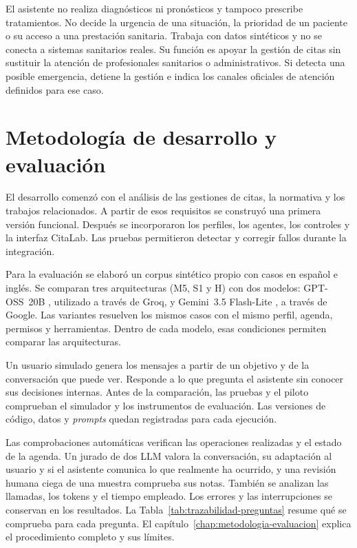 El asistente no realiza diagnósticos ni pronósticos y tampoco prescribe
tratamientos. No decide la urgencia de una situación, la prioridad de un
paciente o su acceso a una prestación sanitaria. Trabaja con datos sintéticos y
no se conecta a sistemas sanitarios reales. Su función es apoyar la gestión de
citas sin sustituir la atención de profesionales sanitarios o administrativos.
Si detecta una posible emergencia, detiene la gestión e indica los canales
oficiales de atención definidos para ese caso.

\section{Metodología de desarrollo y evaluación}

El desarrollo comenzó con el análisis de las gestiones de citas, la normativa
y los trabajos relacionados. A partir de esos requisitos se construyó una
primera versión funcional. Después se incorporaron los perfiles, los agentes,
los controles y la interfaz CitaLab. Las pruebas permitieron detectar y
corregir fallos durante la integración.

Para la evaluación se elaboró un corpus sintético propio con casos en español
e inglés. Se comparan tres arquitecturas (M5, S1 y H) con dos modelos:
GPT-OSS~20B \citep{openai2025gptoss}, utilizado a través de Groq, y
Gemini~3.5 Flash-Lite \citep{gemini35FlashLiteDocs}, a través de Google.
Las variantes resuelven los mismos casos con el mismo perfil, agenda,
permisos y herramientas. Dentro de cada modelo, esas condiciones permiten
comparar las arquitecturas.

Un usuario simulado genera los mensajes a partir de un objetivo y de la
conversación que puede ver. Responde a lo que pregunta el asistente sin conocer
sus decisiones internas. Antes de la comparación, las pruebas y el piloto
comprueban el simulador y los instrumentos de evaluación. Las versiones de
código, datos y \emph{prompts} quedan registradas para cada ejecución.

Las comprobaciones automáticas verifican las operaciones realizadas y el
estado de la agenda. Un jurado de dos LLM valora la conversación, su
adaptación al usuario y si el asistente comunica lo que realmente ha ocurrido,
y una revisión humana ciega de una muestra comprueba sus notas. También
se analizan las llamadas, los tokens y el tiempo empleado. Los errores y las
interrupciones se conservan en los resultados. La
Tabla~\ref{tab:trazabilidad-preguntas} resume qué se comprueba para cada
pregunta. El capítulo~\ref{chap:metodologia-evaluacion} explica el procedimiento
completo y sus límites.

